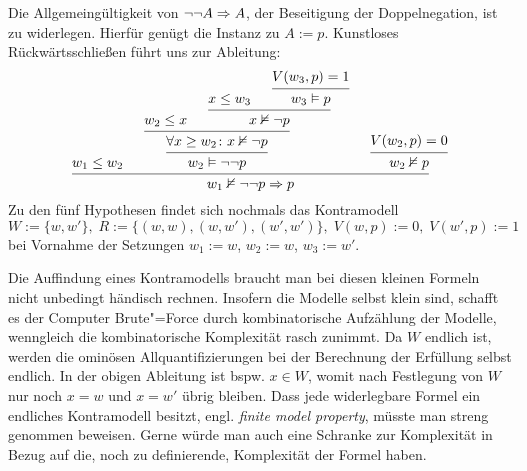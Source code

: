  Die Allgemeingültigkeit von $\lnot\lnot A\Rightarrow A$,
der Beseitigung der Doppelnegation, ist zu widerlegen. Hierfür genügt die
Instanz zu $A:=p$. Kunstloses Rückwärtsschließen führt uns zur Ableitung:
\[\begin{prooftree}
  \hypo{w_1\le w_2}
      \hypo{w_2\le x}
        \hypo{x\le w_3}
          \hypo{V(w_3,p)=1}
        \infer1{w_3\models p}
      \infer2{x\refutes\lnot p}
    \infer2{\forall x\ge w_2\colon x\refutes\lnot p}
  \infer1{w_2\models\lnot\lnot p}
    \hypo{V(w_2,p)=0}
  \infer1{w_2\refutes p}
\infer3{w_1\refutes\lnot\lnot p\cond p}
\end{prooftree}\]
Zu den fünf Hypothesen findet sich nochmals das Kontramodell
\[W:=\{w,w'\},\;R := \{(w,w),(w,w'),(w',w')\},\;V(w,p):=0,\;V(w',p):=1\]
bei Vornahme der Setzungen $w_1:=w$, $w_2:=w$, $w_3:=w'$.

Die Auffindung eines Kontramodells braucht man bei diesen kleinen
Formeln nicht unbedingt händisch rechnen. Insofern die Modelle selbst
klein sind, schafft es der Computer Brute"=Force durch kombinatorische
Aufzählung der Modelle, wenngleich die kombinatorische Komplexität
rasch zunimmt. Da $W$ endlich ist, werden die ominösen
Allquantifizierungen bei der Berechnung der Erfüllung selbst endlich.
In der obigen Ableitung ist bspw. $x\in W$, womit nach Festlegung von $W$
nur noch $x=w$ und $x=w'$ übrig bleiben. Dass jede widerlegbare Formel
ein endliches Kontramodell besitzt, engl. \emph{finite model property},
müsste man streng genommen beweisen. Gerne würde man auch eine Schranke
zur Komplexität in Bezug auf die, noch zu definierende, Komplexität der
Formel haben.

